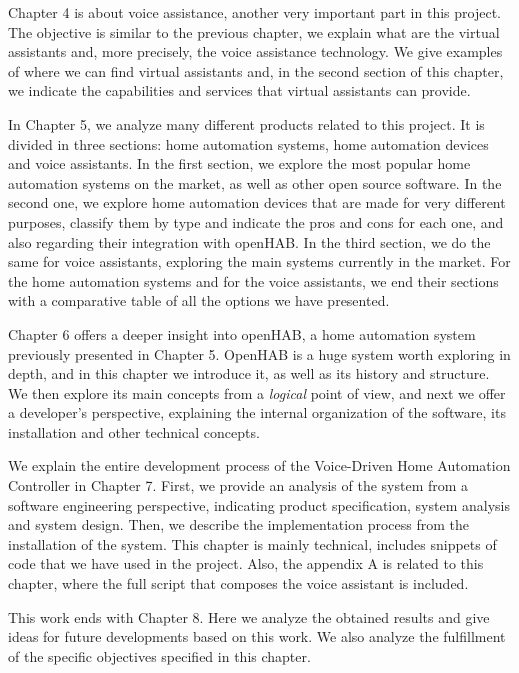 Chapter 4 is about voice assistance, another very important part in this project. The objective is similar to the previous
chapter, we explain what are the virtual assistants and, more precisely, the voice assistance technology. We give examples of where
we can find virtual assistants and, in the second section of this chapter, we indicate the capabilities and services that virtual
assistants can provide.

In Chapter 5, we analyze many different products related to this project. It is divided in three sections: home automation
systems, home automation devices and voice assistants. In the first section, we explore the most popular home automation systems
on the market, as well as other open source software. In the second one, we explore home automation devices that are made for very
different purposes, classify them by type and indicate the pros and cons for each one, and also regarding their integration with openHAB.
In the third section, we do the same for voice assistants, exploring the main systems currently in the market. For the home automation
systems and for the voice assistants, we end their sections with a comparative table of all the options we have presented.

Chapter 6 offers a deeper insight into openHAB, a home automation system previously presented in Chapter 5. OpenHAB is a
huge system worth exploring in depth, and in this chapter we introduce it, as well as its history and structure. We then explore its
main concepts from a \textit{logical} point of view, and next we offer a developer's perspective, explaining the internal organization
of the software, its installation and other technical concepts.

We explain the entire development process of the Voice-Driven Home Automation Controller in Chapter 7. First, we provide an analysis 
of the system from a software engineering perspective, indicating product specification, system analysis and system design. Then, 
we describe the implementation process from the installation of the system. This chapter is mainly technical, includes snippets of 
code that we have used in the project. Also, the appendix A is related to this chapter, where the full script that composes the 
voice assistant is included.

This work ends with Chapter 8. Here we analyze the obtained results and give ideas for future developments based on this
work. We also analyze the fulfillment of the specific objectives specified in this chapter.

